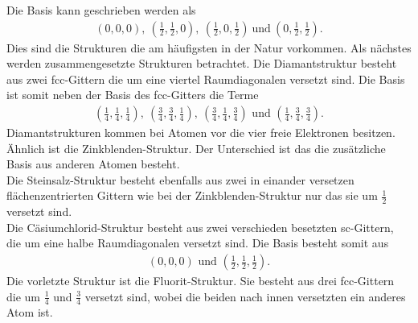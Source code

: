 Die Basis kann geschrieben werden als
\begin{align}
	\left( 0, 0, 0\right),\ \left( \frac{1}{2},\frac{1}{2},0\right),\ \left(\frac{1}{2}, 0 , \frac{1}{2}\right)\ \text{und}\ \left(0,\frac{1}{2},\frac{1}{2}\right).
\end{align}
Dies sind die Strukturen die am häufigsten in der Natur vorkommen. Als nächstes werden zusammengesetzte Strukturen betrachtet.
Die Diamantstruktur besteht aus zwei fcc-Gittern die um eine viertel Raumdiagonalen versetzt sind. Die Basis ist somit neben der Basis des fcc-Gitters die Terme
\begin{align}
 \left(\frac{1}{4},\frac{1}{4},\frac{1}{4}\right),\ \left(\frac{3}{4},\frac{3}{4},\frac{1}{4}\right),\ \left(\frac{3}{4},\frac{1}{4},\frac{3}{4}\right)\text{ und } \left(\frac{1}{4},\frac{3}{4},\frac{3}{4}\right).
\end{align}
Diamantstrukturen kommen bei Atomen vor die vier freie Elektronen besitzen.\\
Ähnlich ist die Zinkblenden-Struktur. Der Unterschied ist das die zusätzliche Basis aus anderen Atomen besteht.\\
Die Steinsalz-Struktur besteht ebenfalls aus zwei in einander versetzen flächenzentrierten Gittern wie bei der Zinkblenden-Struktur nur das sie um $\frac{1}{2}$ versetzt sind.\\
Die Cäsiumchlorid-Struktur besteht aus zwei verschieden besetzten sc-Gittern, die um eine halbe Raumdiagonalen versetzt sind. Die Basis besteht somit aus 
\begin{align}
	\left(0,0,0\right)\text{ und }\left(\frac{1}{2},\frac{1}{2},\frac{1}{2}\right).
\end{align}
Die vorletzte Struktur ist die Fluorit-Struktur. Sie besteht aus drei fcc-Gittern die um $\frac{1}{4}$ und $\frac{3}{4}$ versetzt sind, wobei die beiden nach innen versetzten ein anderes Atom ist.\\
